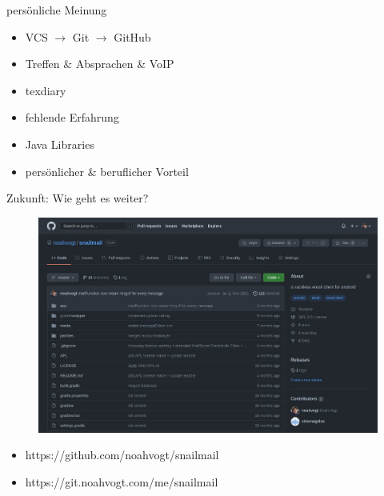 \documentclass[aspectratio=169]{beamer}
\begin{document}
\begin{frame}{persönliche Meinung}
\begin{varwidth}{.4\textwidth}
        \begin{itemize}
            \item VCS $\rightarrow$ Git $\rightarrow$ GitHub
            \item Treffen \& Absprachen \& VoIP
            \item texdiary
        \end{itemize}
    \end{varwidth}
    \hfill
    \begin{varwidth}{.4\textwidth}
        \begin{itemize}
            \item fehlende Erfahrung
            \item Java Libraries
            \item persönlicher \& beruflicher Vorteil
        \end{itemize}
    \end{varwidth} 
\end{frame}

\begin{frame}{Zukunft: Wie geht es weiter?}
    \begin{figure}
        \centering
        \includegraphics[height=.7\textheight]{media/github-repo.jpg}
    \end{figure}
    \begin{itemize}
        \centering
        \item https://github.com/noahvogt/snailmail
        \item https://git.noahvogt.com/me/snailmail
    \end{itemize}
\end{frame}
\end{document}
